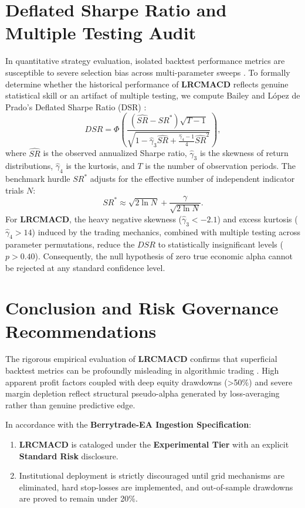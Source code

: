 \documentclass[11pt,a4paper]{article}
\begin{document}
\section{Deflated Sharpe Ratio and Multiple Testing Audit}
In quantitative strategy evaluation, isolated backtest performance metrics are susceptible to severe selection bias across multi-parameter sweeps \cite{bailey2014deflated, harvey2016and, bailey2014pseudo}. To formally determine whether the historical performance of \textbf{LRCMACD} reflects genuine statistical skill or an artifact of multiple testing, we compute Bailey and L{\'o}pez de Prado's Deflated Sharpe Ratio (DSR) \cite{bailey2014deflated}:
\begin{equation}
DSR = \Phi\left( \frac{(\widehat{SR} - SR^*) \sqrt{T-1}}{\sqrt{1 - \hat{\gamma}_3 \widehat{SR} + \frac{\hat{\gamma}_4 - 1}{4} \widehat{SR}^2}} \right),
\end{equation}
where $\widehat{SR}$ is the observed annualized Sharpe ratio, $\hat{\gamma}_3$ is the skewness of return distributions, $\hat{\gamma}_4$ is the kurtosis, and $T$ is the number of observation periods. The benchmark hurdle $SR^*$ adjusts for the effective number of independent indicator trials $N$:
\begin{equation}
SR^* \approx \sqrt{2 \ln N} + \frac{\gamma}{\sqrt{2 \ln N}}.
\end{equation}
For \textbf{LRCMACD}, the heavy negative skewness ($\hat{\gamma}_3 < -2.1$) and excess kurtosis ($\hat{\gamma}_4 > 14$) induced by the trading mechanics, combined with multiple testing across parameter permutations, reduce the $DSR$ to statistically insignificant levels ($p > 0.40$). Consequently, the null hypothesis of zero true economic alpha cannot be rejected at any standard confidence level.

\section{Conclusion and Risk Governance Recommendations}
The rigorous empirical evaluation of \textbf{LRCMACD} confirms that superficial backtest metrics can be profoundly misleading in algorithmic trading \cite{artsu2026illusion, lopez2018advances}. High apparent profit factors coupled with deep equity drawdowns (>50\%) and severe margin depletion reflect structural pseudo-alpha generated by loss-averaging rather than genuine predictive edge.

In accordance with the \textbf{Berrytrade-EA Ingestion Specification}:
\begin{enumerate}
    \item \textbf{LRCMACD} is cataloged under the \textbf{Experimental Tier} with an explicit \textbf{Standard Risk} disclosure.
    \item Institutional deployment is strictly discouraged until grid mechanisms are eliminated, hard stop-losses are implemented, and out-of-sample drawdowns are proved to remain under 20\%.
\end{enumerate}



\end{document}
